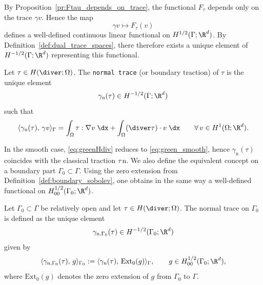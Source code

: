 By Proposition~\ref{pr:Ftau_depends_on_trace}, the functional $F_\tau$ depends only on the trace $\gamma v$. Hence the map
\begin{equation*}
	\gamma v \mapsto F_\tau(v)
\end{equation*}
defines a well-defined continuous linear functional on $H^{1/2}(\Gamma;\R^d)$. By Definition~\ref{def:dual_trace_spaces}, there therefore exists a unique element of $H^{-1/2}(\Gamma;\R^d)$ representing this functional.

\begin{definition}\label{def:normal_trace}
	Let $\tau\in H(\diver;\Omega)$. The {\tt normal trace} (or boundary traction) of $\tau$ is the unique element
	\begin{equation*}
		\gamma_{\mathrm{n}}(\tau)\in H^{-1/2}(\Gamma;\R^d)
	\end{equation*}
	such that
	\begin{equation}\label{eq:greenHdiv}
		\langle \gamma_{\mathrm{n}}(\tau),\,\gamma v\rangle_{\Gamma}
		=
		\int_\Omega \tau:\nabla v\;\dx + \int_\Omega (\diver\tau)\cdot v\;\dx
		\qquad\forall\,v\in H^1(\Omega;\R^d).
	\end{equation}
\end{definition}
In the smooth case, \eqref{eq:greenHdiv} reduces to \eqref{eq:green_smooth}, hence $\gamma_{\mathrm{n}}(\tau)$ coincides with the classical traction $\tau\,\mathrm n$. We also define the equivalent concept on a boundary part $\Gamma_0\subset\Gamma$. Using the zero extension from Definition~\ref{def:boundary_sobolev}, one obtains in the same way a well-defined functional on $H^{1/2}_{00}(\Gamma_0;\R^d)$.

\begin{definition}\label{def:normal_trace_part}
	Let $\Gamma_0\subset\Gamma$ be relatively open and let $\tau\in H(\diver;\Omega)$. The normal trace on $\Gamma_0$ is defined as the unique element
	\begin{equation*}
		\gamma_{\mathrm{n},\Gamma_0}(\tau)\in H^{-1/2}(\Gamma_0;\R^d)
	\end{equation*}
	given by
	\begin{equation*}
		\langle \gamma_{\mathrm{n},\Gamma_0}(\tau),\,g\rangle_{\Gamma_0}
		:=
		\langle \gamma_{\mathrm{n}}(\tau),\,\mathrm{Ext}_0 (g)\rangle_{\Gamma},
		\qquad g\in H^{1/2}_{00}(\Gamma_0;\R^d),
	\end{equation*}
	where $\mathrm{Ext}_0 (g)$ denotes the zero extension of $g$ from $\Gamma_0$ to $\Gamma$.
\end{definition}

